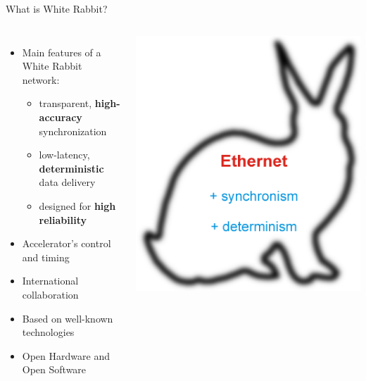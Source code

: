 \documentclass[compress,red]{beamer}
\begin{document}
\begin{frame}{What is White Rabbit?}

\begin{columns}[c]
	  \begin{itemize}
		\item Main features of a White Rabbit network:
		\begin{itemize}
		  \item transparent,  {\bf high-accuracy} synchronization
		  \item low-latency,  {\bf deterministic} data delivery
		  \item designed for  {\bf high reliability}
		\end{itemize}
		\item Accelerator's control and timing
		\item International collaboration
		\item Based on well-known technologies
		\item Open Hardware and Open Software

	  \end{itemize}
		\begin{center}
		\hspace{-0.5cm}
		\includegraphics[width=1.1\textwidth]{misc/rabbit.pdf}

		\end{center}
	\end{columns}

\end{frame}
\end{document}
